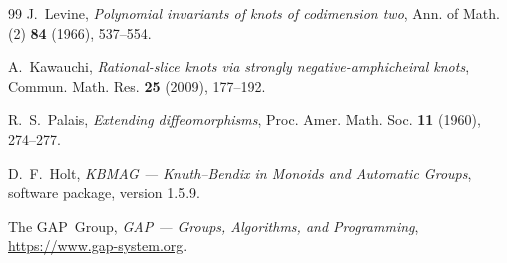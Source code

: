 \documentclass[11pt]{article}
\theoremstyle{definition}
\begin{document}
\begin{thebibliography}{99}
J.~Levine,
\emph{Polynomial invariants of knots of codimension two},
Ann. of Math. (2) \textbf{84} (1966), 537--554.

A.~Kawauchi,
\emph{Rational-slice knots via strongly negative-amphicheiral knots},
Commun. Math. Res. \textbf{25} (2009), 177--192.

R.~S.~Palais,
\emph{Extending diffeomorphisms},
Proc. Amer. Math. Soc. \textbf{11} (1960), 274--277.

D.~F.~Holt,
\emph{KBMAG --- Knuth--Bendix in Monoids and Automatic Groups},
software package, version 1.5.9.

The GAP~Group,
\emph{GAP --- Groups, Algorithms, and Programming},\newline
\url{https://www.gap-system.org}.

\end{thebibliography}
\endgroup
\end{document}
